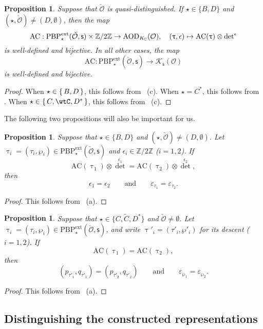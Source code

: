 \documentclass[12pt,a4paper]{amsart}
\newcommand{\CK}{{\mathcal {K}}}
\newcommand{\CO}{{\mathcal {O}}}
\newcommand{\Z}{\mathbb{Z}}
\numberwithin{equation}{section}
\newtheorem{prop}[thm]{Proposition}
\theoremstyle{remark}
\def\PBPe{\mathrm{PBP}^{\mathrm{ext}}}
\begin{document}
\begin{prop}\label{thmac3}
Suppose that  $\check \CO$ is quasi-distinguished.  If $\star\in \{B,D\}$ and $(\star, \check \CO)\neq (D, \emptyset)$, then  the map
\[
\mathrm{AC}: \PBPe_\star(\check \CO,\mathsf s)\times \Z/2\Z \rightarrow  \mathrm{AOD}_{K_\C}(\CO),\quad (\uptau, \epsilon)\mapsto \mathrm{AC}(\uptau)\otimes {\det}^{\epsilon}
\]
is well-defined and bijective. In all other cases, the
map
\[
\mathrm{AC}: \PBPe_\star(\check \CO,\mathsf s)\rightarrow  \CK_{\mathsf s}(\CO)
\]
is well-defined and bijective.
\end{prop}
\begin{proof}
When $\star\in \set{B,D}$, this follows from ~(c).
When $\star = C^{*}$, this follows from .
When $\star\in \set{C,\wtC,D^{*}}$, this follows from ~(c).
\end{proof}


The following two propositions will also be important for us.
\begin{prop}\label{thmac4}
Suppose that  $\star\in \{B,D\}$ and $(\star, \check \CO)\neq (D, \emptyset)$. Let $\uptau_i=(\tau_i, \wp_i)\in \PBPe_\star(\check \CO,\mathsf s)$ and $\epsilon_i\in \Z/2\Z$ ($i=1,2$).   If
\[
  \mathrm{AC}(\uptau_1)\otimes {\det}^{\epsilon_1}= \mathrm{AC}(\uptau_2)\otimes {\det}^{\epsilon_2},
\]
then
\[
  \epsilon_1=\epsilon_2\qquad\textrm{and}\qquad \varepsilon_{\tau_1}=\varepsilon_{\tau_2}.
\]
 \end{prop}
\begin{proof}
  This follows from ~(a).
\end{proof}

\begin{prop}\label{thmac5}
Suppose that  $\star\in \{C,\widetilde C, D^*\}$ and $\check \CO\neq \emptyset$. Let $\uptau_i=(\tau_i, \wp_i)\in \PBPe_\star(\check \CO,\mathsf s)$, and write $\uptau'_i=(\tau'_i, \wp'_i)$ for its descent ($i=1,2$).   If
\[
  \mathrm{AC}(\uptau_1)= \mathrm{AC}(\uptau_2),
\]
then
\[
 ( p_{\tau'_1}, q_{\tau'_1})=( p_{\tau'_2}, q_{\tau'_2})\qquad\textrm{and}\qquad \varepsilon_{\wp_1}=\varepsilon_{\wp_2}.
\]
 \end{prop}
\begin{proof}
  This follows from ~(a).
\end{proof}

\subsection{Distinguishing the constructed representations}
\end{document}
